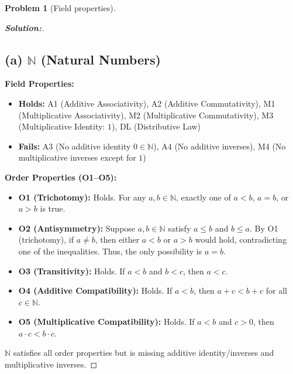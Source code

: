 \documentclass[12pt]{article}
\theoremstyle{definition}\newtheorem{problem}{Problem}
\newenvironment{solution}{\begin{proof}[\bfseries\textup{Solution:}]}{\end{proof}}
\begin{document}
\newpage
\begin{problem}[Field properties]
\end{problem}

\begin{solution}

    \subsection*{(a) $\mathbb{N}$ (Natural Numbers)}
        
    \textbf{Field Properties:}
    \begin{itemize}
        \item \textbf{Holds:}  
        A1 (Additive Associativity), A2 (Additive Commutativity),  
        M1 (Multiplicative Associativity), M2 (Multiplicative Commutativity),  
        M3 (Multiplicative Identity: $1$), DL (Distributive Law)
        
        \item \textbf{Fails:}  
        A3 (No additive identity $0 \in \mathbb{N}$),  
        A4 (No additive inverses),  
        M4 (No multiplicative inverses except for $1$)
    \end{itemize}
        
    \textbf{Order Properties (O1–O5):}
    \begin{itemize}
        \item \textbf{O1 (Trichotomy):} Holds. For any $a, b \in \mathbb{N}$, exactly one of $a < b$, $a = b$, or $a > b$ is true.
        \item \textbf{O2 (Antisymmetry):} Suppose $a, b \in \mathbb{N}$ satisfy $a \le b$ and $b \le a$. By O1 (trichotomy), if $a \neq b$, then either $a < b$ or $a > b$ would hold, contradicting one of the inequalities. Thus, the only possibility is $a = b$.
        \item \textbf{O3 (Transitivity):} Holds. If $a < b$ and $b < c$, then $a < c$.
        \item \textbf{O4 (Additive Compatibility):} Holds. If $a < b$, then $a + c < b + c$ for all $c \in \mathbb{N}$.
        \item \textbf{O5 (Multiplicative Compatibility):} Holds. If $a < b$ and $c > 0$, then $a \cdot c < b \cdot c$.
    \end{itemize}
        
    $\mathbb{N}$ satisfies all order properties but is missing additive identity/inverses and multiplicative inverses.
        

\end{solution}
\end{document}
